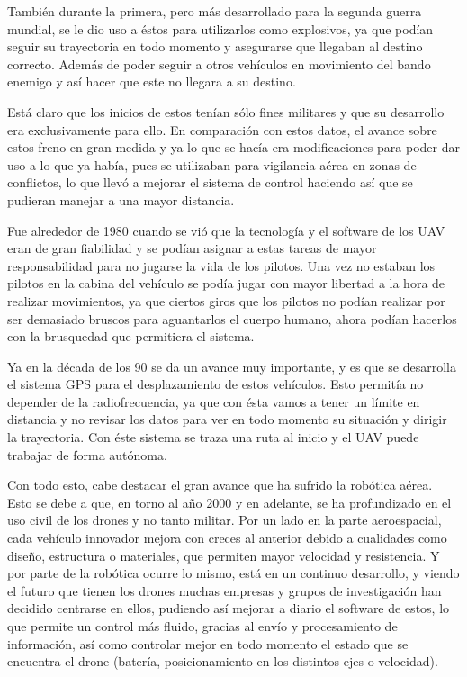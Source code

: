 \hspace{1cm} Tambi\'en durante la primera, pero m\'as desarrollado para la segunda guerra mundial, se le dio uso a \'estos para utilizarlos como explosivos, ya que pod\'ian seguir su trayectoria en todo momento y asegurarse que llegaban al destino correcto. Adem\'as de poder seguir a otros veh\'iculos en movimiento del bando enemigo y as\'i hacer que este no llegara a su destino. 

\hspace{1cm} Est\'a claro que los inicios de estos ten\'ian s\'olo fines militares y que su desarrollo era exclusivamente para ello. En comparaci\'on con estos datos, el avance sobre estos freno en gran medida y ya lo que se hac\'ia era modificaciones para poder dar uso a lo que ya hab\'ia, pues se utilizaban para vigilancia a\'erea en zonas de conflictos, lo que llev\'o a mejorar el sistema de control haciendo as\'i que se pudieran manejar a una mayor distancia. 

\hspace{1 cm}Fue alrededor de 1980 cuando se vi\'o que la tecnolog\'ia y el software de los UAV eran de gran fiabilidad y se pod\'ian asignar a estas tareas de mayor responsabilidad para no jugarse la vida de los pilotos. Una vez no estaban los pilotos en la cabina del veh\'iculo se pod\'ia jugar con mayor libertad a la hora de realizar movimientos, ya que ciertos giros que los pilotos no pod\'ian realizar por ser demasiado bruscos para aguantarlos el cuerpo humano, ahora pod\'ian hacerlos con la brusquedad que permitiera el sistema.  

\hspace{1 cm} Ya en la d\'ecada de los 90 se da un avance muy importante, y es que se desarrolla el sistema GPS para el desplazamiento de estos veh\'iculos. Esto permit\'ia no depender de la radiofrecuencia, ya que con \'esta vamos a tener un l\'imite en distancia y no revisar los datos para ver en todo momento su situaci\'on y dirigir la trayectoria. Con \'este sistema se traza una ruta al inicio y el UAV puede trabajar de forma aut\'onoma. 

\hspace{1cm} Con todo esto, cabe destacar el gran avance que ha sufrido la rob\'otica a\'erea. Esto se debe a que, en torno al año 2000 y en adelante, se ha profundizado en el uso civil de los drones y no tanto militar. Por un lado en la parte aeroespacial, cada veh\'iculo innovador mejora con creces al anterior debido a cualidades como diseño, estructura o materiales, que permiten mayor velocidad y resistencia. Y por parte de la rob\'otica ocurre lo mismo, est\'a en un continuo desarrollo, y viendo el futuro que tienen los drones muchas empresas y grupos de investigaci\'on han decidido centrarse en ellos, pudiendo as\'i mejorar a diario el software de estos, lo que permite un control m\'as fluido, gracias al env\'io y procesamiento de informaci\'on, as\'i como controlar mejor en todo momento el estado que se encuentra el drone (bater\'ia, posicionamiento en los distintos ejes o velocidad). 
 


